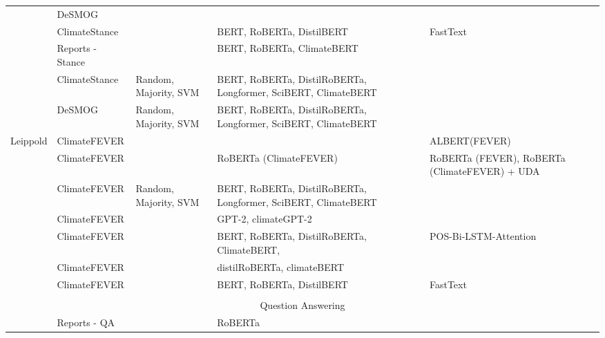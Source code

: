 \begin{longtable}[c]{lp{3cm}p{1.5cm}p{3cm}p{1.5cm}p{3cm}}
    \citet{luo_detecting_2020} & \raggedright DeSMOG &   &  &  &  \\

    \citet{vaid-etal-2022-towards} & \raggedright ClimateStance &  &  BERT, RoBERTa, DistilBERT &  & FastText \\

    \citet{lai_using_2023} & Reports - Stance &   & BERT, RoBERTa, ClimateBERT &  &  \\

    \citet{spokoyny2023answering} & ClimateStance & Random, Majority, SVM & BERT, RoBERTa, DistilRoBERTa, Longformer, SciBERT, ClimateBERT &  &  \\

    \citet{spokoyny2023answering} & DeSMOG & Random, Majority, SVM & BERT, RoBERTa, DistilRoBERTa, Longformer, SciBERT, ClimateBERT &  &  \\

    Leippold \cite{diggelmann_climate-fever_2020} & ClimateFEVER &   &  &  & ALBERT(FEVER) \\

    \citet{Wang2021EvidenceBA} &  ClimateFEVER &  &  RoBERTa (ClimateFEVER) &  & RoBERTa (FEVER), RoBERTa (ClimateFEVER) + UDA \\

    \citet{spokoyny2023answering} & ClimateFEVER & Random, Majority, SVM &  BERT, RoBERTa, DistilRoBERTa, Longformer, SciBERT, ClimateBERT &  &  \\

    \citet{vaghefi2022deep} & \raggedright ClimateFEVER &  &  GPT-2, climateGPT-2 &  &  \\

    \citet{xiang_dare_2023} & \raggedright ClimateFEVER &  &  BERT, RoBERTa, DistilRoBERTa, ClimateBERT,  &  & POS-Bi-LSTM-Attention \\

    \citet{nicolas_webersinke_climatebert_2021} & \raggedright ClimateFEVER  &  & distilRoBERTa, climateBERT &  &  \\

    \citet{vaid-etal-2022-towards} & \raggedright ClimateFEVER &  &  BERT, RoBERTa, DistilBERT &  & FastText \\
&&&&&\\
    \multicolumn{6}{c}{Question Answering} \\
\midrule
    \citet{luccioni_analyzing_2020} & \raggedright Reports - QA &   & RoBERTa &  &  \\


\end{longtable}

